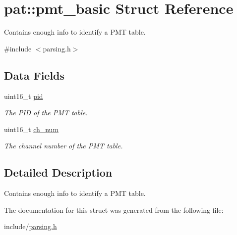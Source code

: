 \hypertarget{structpat_1_1pmt__basic}{}\section{pat\+:\+:pmt\+\_\+basic Struct Reference}
\label{structpat_1_1pmt__basic}


Contains enough info to identify a P\+MT table.  




{\ttfamily \#include $<$parsing.\+h$>$}

\subsection*{Data Fields}
\begin{DoxyCompactItemize}
\item 
uint16\+\_\+t \hyperlink{structpat_1_1pmt__basic_ad9371c0424eaba7e28b0867ff4ee20cb}{pid}\hypertarget{structpat_1_1pmt__basic_ad9371c0424eaba7e28b0867ff4ee20cb}{}\label{structpat_1_1pmt__basic_ad9371c0424eaba7e28b0867ff4ee20cb}

\begin{DoxyCompactList}\small\item\em The P\+ID of the P\+MT table. \end{DoxyCompactList}\item 
uint16\+\_\+t \hyperlink{structpat_1_1pmt__basic_ab0c03378d12bd321942c8a68721bcb51}{ch\+\_\+num}\hypertarget{structpat_1_1pmt__basic_ab0c03378d12bd321942c8a68721bcb51}{}\label{structpat_1_1pmt__basic_ab0c03378d12bd321942c8a68721bcb51}

\begin{DoxyCompactList}\small\item\em The channel number of the P\+MT table. \end{DoxyCompactList}\end{DoxyCompactItemize}


\subsection{Detailed Description}
Contains enough info to identify a P\+MT table. 

The documentation for this struct was generated from the following file\+:\begin{DoxyCompactItemize}
\item 
include/\hyperlink{parsing_8h}{parsing.\+h}\end{DoxyCompactItemize}

